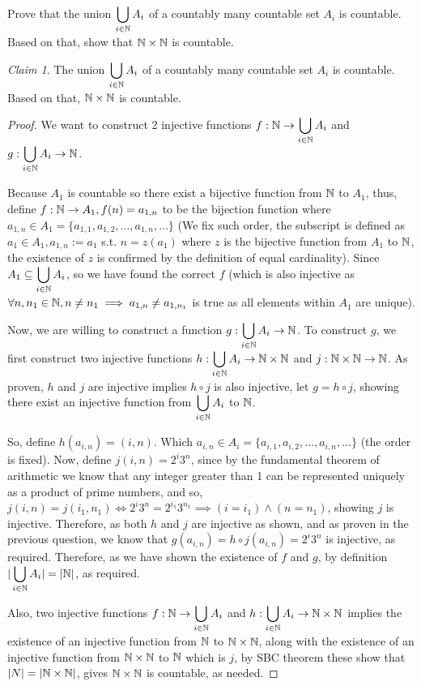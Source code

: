 \documentclass{homework}
\newcommand{\N}{\bb{N}} %
\newcommand{\ra}{\rightarrow}
\newcommand{\?}{\stackrel{?}{=}}
\theoremstyle{remark}
\newtheorem*{claim}{Claim}
\begin{document}
\question[3] Prove that the union $\displaystyle\bigcup_{i\in\N}A_i$ of a countably many countable set $A_i$ is countable. Based on that, show that $\N \times \N$ is countable.
\begin{claim}
    The union $\displaystyle\bigcup_{i\in\N}A_i$ of a countably many countable set $A_i$ is countable. Based on that,  $\N \times \N$ is countable.
\end{claim}
\begin{proof}
    We want to construct 2 injective functions $f:\N\ra \displaystyle\bigcup_{i\in\N}A_i$ and $g: \displaystyle\bigcup_{i\in\N}A_i\ra\N$.

    Because $A_1$ is countable so there exist a bijective function from $\N$ to $A_1$, thus, define $f:\N\ra A_1, f(n)=a_{1,n}$ to be the bijection function where $a_{1,n}\in A_1=\{a_{1,1},a_{1,2},\ldots,a_{1,n},\ldots\}$ (We fix such order, the subscript is defined as $a_1\in A_1, a_{1,n}:=a_1$ s.t. $n=z(a_1)$ where $z$ is the bijective function from $A_1$ to $\N$, the existence of $z$ is confirmed by the definition of equal cardinality). Since $A_1\subseteq \displaystyle\bigcup_{i\in\N}A_i$, so we have found the correct $f$ (which is also injective as $\forall n,n_1\in\N, n\neq n_1\implies a_{1,n}\neq a_{1,n_1}$ is true as all elements within $A_1$ are unique). 

    Now, we are willing to construct a function $g: \displaystyle\bigcup_{i\in\N}A_i\ra\N$. To construct $g$, we first construct two injective functions $h: \displaystyle\bigcup_{i\in\N}A_i\ra\N\times\N$ and  $j: \N\times\N\ra\N$. As proven, $h$ and $j$ are injective implies $h\circ j$ is also injective, let $g=h\circ j$, showing there exist an injective function from  $ \displaystyle\bigcup_{i\in\N}A_i$  to $\N$.  

    So, define $h(a_{i,n})=(i,n)$. Which $a_{i,n}\in A_i=\{a_{i,1},a_{i,2},\ldots,a_{i,n},\ldots\}$ (the order is fixed).  Now, define $j(i,n)=2^i3^n$, since by the fundamental theorem of arithmetic we know that any integer greater than 1 can be represented uniquely as a product of prime numbers, and so, $j(i,n)=j(i_1,n_1)\iff 2^i3^n=2^{i_{1}}3^{n_{1}}\implies (i=i_1)\land(n=n_1)$, showing $j$ is injective. Therefore, as both $h$ and $j$ are injective as shown, and as proven in the previous question, we know that $g(a_{i,n})=h\circ j(a_{i,n})=2^i3^n$ is injective, as required. Therefore, as we have shown the existence of $f$ and $g$, by definition $|\displaystyle\bigcup_{i\in\N}A_i|=|\N|$, as required. 

    Also, two injective functions $f:\N\ra \displaystyle\bigcup_{i\in\N}A_i$ and $h: \displaystyle\bigcup_{i\in\N}A_i\ra\N\times\N$ implies the existence of an injective function from $\N$ to $\N\times\N$, along with the existence of an injective function from $\N\times\N$ to $\N$ which is $j$, by SBC theorem these show that $|N|=|\N\times\N|$, gives $\N\times\N$ is countable, as needed. 
    \end{proof}
\end{document}
